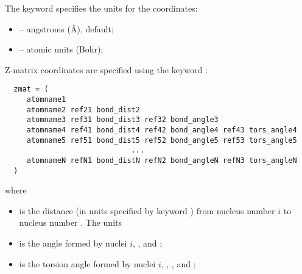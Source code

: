 The keyword  specifies the units for the coordinates:
\begin{itemize}
\item {} -- angstroms (\AA), default;
\item {} -- atomic units (Bohr);
\end{itemize}

\noindent
Z-matrix coordinates are specified using the keyword :
\begin{verbatim}
  zmat = (
     atomname1
     atomname2 ref21 bond_dist2
     atomname3 ref31 bond_dist3 ref32 bond_angle3 
     atomname4 ref41 bond_dist4 ref42 bond_angle4 ref43 tors_angle4 
     atomname5 ref51 bond_dist5 ref52 bond_angle5 ref53 tors_angle5 
                             ...                
     atomnameN refN1 bond_distN refN2 bond_angleN refN3 tors_angleN 
  )
\end{verbatim}
where
\begin{itemize}
\item {} is the distance (in units specified by
keyword ) from nucleus number $i$ to
nucleus number . The units 
\item {} is the angle formed by nuclei $i$,
, and ;
\item {} is the torsion angle formed by nuclei $i$,
, , and ;
\end{itemize}

